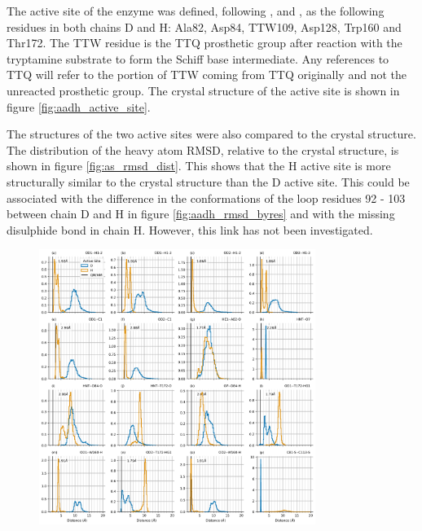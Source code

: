 The active site of the enzyme was defined, following \cite{ranaghanInitioQMMM2017}, \cite{masgrauAtomicDescriptionEnzyme2006} and \cite{masgrauTunnelingClassicalPaths2007},  as the following residues in both chains D and H: Ala82, Asp84, TTW109, Asp128, Trp160 and Thr172. The TTW residue is the TTQ prosthetic group after reaction with the tryptamine substrate to form the Schiff base intermediate. Any references to TTQ will refer to the portion of TTW coming from TTQ originally and not the unreacted prosthetic group. The crystal structure of the active site is shown in figure \ref{fig:aadh_active_site}. 

The structures of the two active sites were also compared to the crystal structure. The distribution of the heavy atom RMSD, relative to the crystal structure, is shown in figure \ref{fig:as_rmsd_dist}. This shows that the H active site is more structurally similar to the crystal structure than the D active site. This could be associated with the difference in the conformations of the loop residues 92 - 103 between chain D and H in figure \ref{fig:aadh_rmsd_byres} and with the missing disulphide bond in chain H. However, this link has not been investigated. 

\begin{figure}
    \centering
    \includegraphics[width=0.8\textwidth]{chapters/aadh/figures/bond_distances_dist.png}
    \label{fig:bond_dist}
\end{figure}


